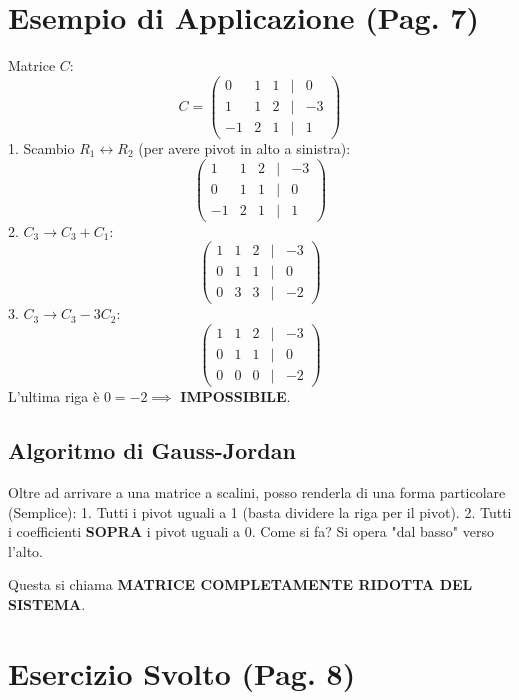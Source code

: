 \section{Esempio di Applicazione (Pag. 7)}

Matrice $C$:
\[
C = \begin{pmatrix}
0 & 1 & 1 & | & 0 \\
1 & 1 & 2 & | & -3 \\
-1 & 2 & 1 & | & 1
\end{pmatrix}
\]
1. Scambio $R_1 \leftrightarrow R_2$ (per avere pivot in alto a sinistra):
\[
\begin{pmatrix}
1 & 1 & 2 & | & -3 \\
0 & 1 & 1 & | & 0 \\
-1 & 2 & 1 & | & 1
\end{pmatrix}
\]
2. $C_3 \to C_3 + C_1$:
\[
\begin{pmatrix}
1 & 1 & 2 & | & -3 \\
0 & 1 & 1 & | & 0 \\
0 & 3 & 3 & | & -2
\end{pmatrix}
\]
3. $C_3 \to C_3 - 3C_2$:
\[
\begin{pmatrix}
1 & 1 & 2 & | & -3 \\
0 & 1 & 1 & | & 0 \\
0 & 0 & 0 & | & -2
\end{pmatrix}
\]
L'ultima riga è $0 = -2 \implies$ \textbf{IMPOSSIBILE}.

\subsection{Algoritmo di Gauss-Jordan}
Oltre ad arrivare a una matrice a scalini, posso renderla di una forma particolare (Semplice):
1. Tutti i pivot uguali a 1 (basta dividere la riga per il pivot).
2. Tutti i coefficienti \textbf{SOPRA} i pivot uguali a 0.
Come si fa? Si opera "dal basso" verso l'alto.

Questa si chiama \textbf{MATRICE COMPLETAMENTE RIDOTTA DEL SISTEMA}.

\section{Esercizio Svolto (Pag. 8)}

